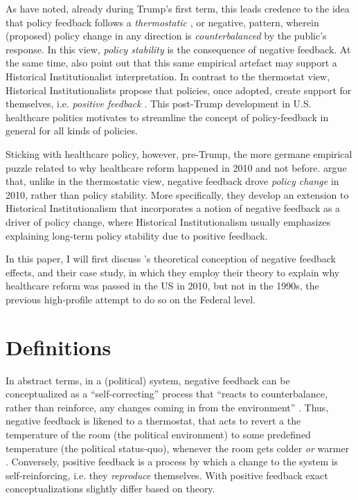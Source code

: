 \documentclass[11pt]{article}
\begin{document}
\begin{figure}[H]
    \sffamily
    
        \label{fig:aca_fav}
\end{figure}


\noindent As \textcite[][]{Busemeyer2019} have noted, already during Trump's first term, this leads credence to the idea that policy feedback follows a \textit{thermostatic} \parencite[][]{Wlezien1995}, or negative, pattern, wherein (proposed) policy change in any direction is \textit{counterbalanced} by the public's response. In this view, \textit{policy stability} is the consequence of negative feedback. At the same time, \textcite[][]{Busemeyer2019} also point out that this same empirical artefact may support a Historical Institutionalist interpretation. In contrast to the thermostat view, Historical Institutionalists propose that policies, once adopted, create support for themselves, i.e. \textit{positive feedback} \parencites[see e.g.][]{Pierson1993}{Pierson2000}. This post-Trump development in U.S. healthcare politics motivates \textcite[][]{Busemeyer2019} to streamline the concept of policy-feedback in general for all kinds of policies.

Sticking with healthcare policy, however, pre-Trump, the more germane empirical puzzle related to why healthcare reform happened in 2010 and not before. \textcite[][]{Jacobs2014} argue that, unlike in the thermostatic view, negative feedback drove \textit{policy change} in 2010, rather than policy stability. More specifically, they develop an extension to Historical Institutionalism that incorporates a notion of negative feedback as a driver of policy change, where Historical Institutionalism usually emphasizes explaining long-term policy stability due to positive feedback. 

In this paper, I will first discuss \citeauthor[][]{Jacobs2014}'s \citeyear{Jacobs2014} theoretical conception of negative feedback effects, and their case study, in which they employ their theory to explain why healthcare reform was passed in the US in 2010, but not in the 1990s, the previous high-profile attempt to do so on the Federal level.


\section*{Definitions}

In abstract terms, in a (political) system, negative feedback can be conceptualized as a \enquote{self-correcting} \parencite[][p. 8]{Baumgartner2002} process that \enquote{reacts to counterbalance, rather than reinforce, any changes coming in from the environment} . Thus, negative feedback is likened to a thermostat, that acts to revert a the temperature of the room (the political environment) to some predefined temperature (the political status-quo), whenever the room gets colder \textit{or} warmer \parencite[][]{Wlezien1995}. Conversely, positive feedback is a process by which a change to the system is self-reinforcing, i.e. they \textit{reproduce} themselves. With positive feedback exact conceptualizations slightly differ based on theory.
\end{document}
